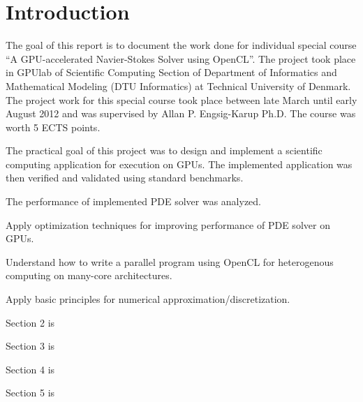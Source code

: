 \chapter{Introduction}
The goal of this report is to document the work done for individual special course \enquote{A GPU-accelerated Navier-Stokes Solver using OpenCL}. The project took place in GPUlab of Scientific Computing Section of Department of Informatics and Mathematical Modeling (DTU Informatics) at Technical University of Denmark. The project work for this special course took place between late March until early August 2012 and was supervised by Allan P. Engsig-Karup Ph.D. The course was worth 5 ECTS points.

The practical goal of this project was to design and implement a scientific computing application for execution on GPUs. The implemented application was then verified and validated using standard benchmarks. 

The performance of implemented PDE solver was analyzed.

Apply optimization techniques for improving performance of PDE solver on GPUs.

Understand how to write a parallel program using OpenCL for heterogenous computing on many-core architectures.

Apply basic principles for numerical approximation/discretization.

Section 2 is 

Section 3 is

Section 4 is

Section 5 is